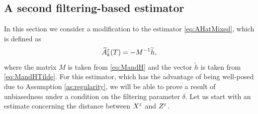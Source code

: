\documentclass[10pt]{article}
\begin{document}
\subsection{A second filtering-based estimator}\label{sec:FilterMLE_2}

In this section we consider a modification to the estimator \eqref{eq:AHatMixed}, which is defined as
\begin{equation}\label{eq:AHatMixedTilde}
	\widetilde A^\varepsilon_k(T) = -M^{-1}\widetilde h,
\end{equation}
where the matrix $M$ is taken from \eqref{eq:MandH} and the vector $\widetilde{h}$ is taken from \eqref{eq:MandHTilde}. For this estimator, which has the advantage of being well-posed due to Assumption \ref{as:regularity}, we will be able to prove a result of unbiasedness under a condition on the filtering parameter $\delta$. Let us start with an estimate concerning the distance between $X^\varepsilon$ and $Z^\varepsilon$. 
\end{document}
